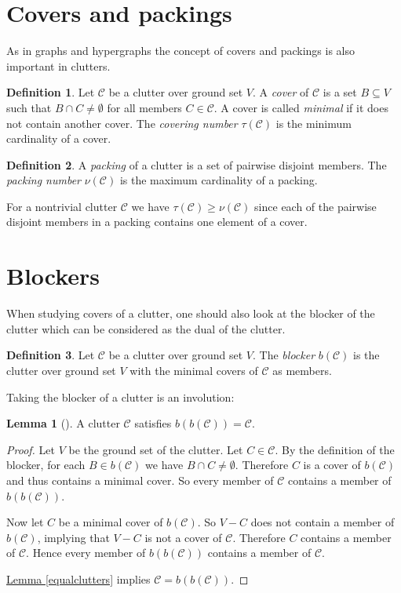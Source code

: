 \documentclass[a4paper, 12pt, twoside=false]{scrbook}
\theoremstyle{definition}
\newtheorem*{definition}{Definition}
\newtheorem{lemma}[theorem]{Lemma}
\begin{document}
\section{Covers and packings}
As in graphs and hypergraphs the concept of covers and packings is also important in clutters.
\begin{definition}
    Let $\mathcal{C}$ be a clutter over ground set $V$.
    A \emph{cover} of $\mathcal{C}$ is a set $B \subseteq V$ such that $B \cap C \neq \emptyset$ for all members $C \in \mathcal{C}$.
    A cover is called \emph{minimal} if it does not contain another cover.
    The \emph{covering number} $\tau(\mathcal{C})$ is the minimum cardinality of a cover.
\end{definition}

\begin{definition}
    A \emph{packing} of a clutter is a set of pairwise disjoint members.
    The \emph{packing number} $\nu(\mathcal{C})$ is the maximum cardinality of a packing.
\end{definition}

For a nontrivial clutter $\mathcal{C}$ we have $\tau(\mathcal{C}) \geq \nu(\mathcal{C})$ since each of the pairwise disjoint members in a packing contains one element of a cover.

\section{Blockers}
When studying covers of a clutter, one should also look at the blocker of the clutter which can be considered as the dual of the clutter.
\begin{definition}
    Let $\mathcal{C}$ be a clutter over ground set $V$.
    The \emph{blocker} $b(\mathcal{C})$ is the clutter over ground set $V$ with the minimal covers of $\mathcal{C}$ as members.
\end{definition}

Taking the blocker of a clutter is an involution:

\begin{lemma}[\cite{blocker}]
    A clutter $\mathcal{C}$ satisfies $b(b(\mathcal{C}))=\mathcal{C}$.
\end{lemma}

\begin{proof}
    Let $V$ be the ground set of the clutter.
    Let $C \in \mathcal{C}$.
    By the definition of the blocker, for each $B \in b(\mathcal{C})$ we have $B\cap C \neq \emptyset$.
    Therefore $C$ is a cover of $b(\mathcal{C})$ and thus contains a minimal cover.
    So every member of $\mathcal{C}$ contains a member of $b(b(\mathcal{C}))$.

    Now let $C$ be a minimal cover of $b(\mathcal{C})$.
    So $V-C$ does not contain a member of $b(\mathcal{C})$, implying that $V-C$ is not a cover of $\mathcal{C}$.
    Therefore $C$ contains a member of $\mathcal{C}$.
    Hence every member of $b(b(\mathcal{C}))$ contains a member of $\mathcal{C}$.

    \hyperref[equalclutters]{Lemma \ref*{equalclutters}} implies $\mathcal{C}=b(b(\mathcal{C}))$.
\end{proof}
\end{document}
